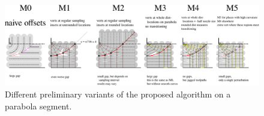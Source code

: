 \begin{figure}
\includegraphics[width=\textwidth]{sources/method/parabola_switch_to_less_lines.pdf}
\caption{Different preliminary variants of the proposed algorithm on a parabola segment.}
\label{parabola_switch_to_less_lines}
\end{figure}

























































